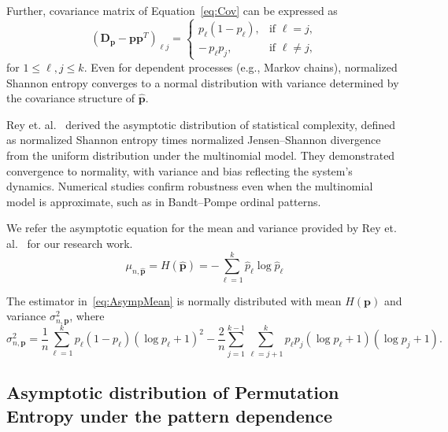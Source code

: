 Further, covariance matrix of Equation~\eqref{eq:Cov} can be expressed as 
\begin{equation}
	(\mathbf{D_p}-\mathbf{pp}^T)_{\ell j} =
	\begin{cases}
		p_{\ell}(1-p_{\ell}), & \text{if } \ell = j, \\[6pt]
		-\,p_{\ell}p_{j}, & \text{if } \ell \neq j,
	\end{cases}
\end{equation}
for $1\leq {\ell}, j\leq k.$
Even for dependent processes (e.g., Markov chains), normalized Shannon entropy converges to a normal distribution with variance determined by the covariance structure of $\widehat{\mathbf{p}}$. 

Rey et. al.~\cite{Rey2025} derived the asymptotic distribution of statistical complexity, defined as normalized Shannon entropy times normalized Jensen–Shannon divergence from the uniform distribution under the multinomial model. They demonstrated convergence to normality, with variance and bias reflecting the system’s dynamics. Numerical studies confirm robustness even when the multinomial model is approximate, such as in Bandt–Pompe ordinal patterns. 

We refer the asymptotic equation for the mean and variance provided by Rey et. al.~\cite{Rey2025} for our research work.
\begin{equation}
	\mu_{n,\widehat{\mathbf{p}}}	= H(\widehat{\mathbf{p}})
	= -\sum_{\ell=1}^k \widehat{p}_\ell \log \widehat{p}_\ell 
	\label{eq:AsympMean}
\end{equation}  

The estimator in~\eqref{eq:AsympMean} is normally distributed with mean $H(\mathbf{p})$ and variance $\sigma^2_{n,\mathbf{p}}$, where
\begin{equation}
	\sigma^2_{n,\mathbf{p}}=\dfrac{1}{n}\sum_{\ell=1}^{k}p_\ell(1-p_\ell)(\log p_\ell+1)^2-\dfrac{2}{n}\sum_{j=1}^{k-1}\sum_{\ell=j+1}^{k}p_\ell p_j(\log p_\ell+1)(\log p_j+1).
\end{equation}


\subsection{Asymptotic distribution of Permutation Entropy under the pattern dependence}\label{Subsec:PatternDependence}

